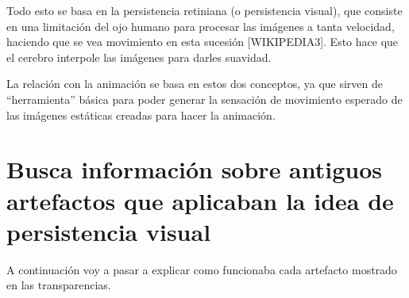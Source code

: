 \documentclass{article}
\begin{document}
\bigskip

Todo esto se basa en la persistencia retiniana (o persistencia visual), que consiste en una limitación del ojo humano para procesar las imágenes a tanta velocidad, haciendo que se vea movimiento en esta sucesión [WIKIPEDIA3]. Esto hace que el cerebro interpole las imágenes para darles suavidad.

\bigskip

La relación con la animación se basa en estos dos conceptos, ya que sirven de ``herramienta'' básica para poder generar la sensación de movimiento esperado de las imágenes estáticas creadas para hacer la animación. 


\section{Busca información sobre antiguos artefactos que aplicaban la idea de persistencia visual}

A continuación voy a pasar a explicar como funcionaba cada artefacto mostrado en las transparencias.
\end{document}
